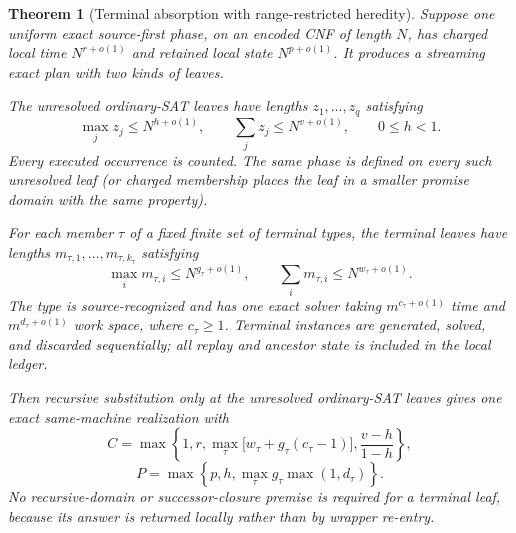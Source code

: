 \documentclass[11pt]{article}
\newtheorem{theorem}{Theorem}
\begin{document}
\begin{theorem}[Terminal absorption with range-restricted heredity]
\label{thm:absorb}
Suppose one uniform exact source-first phase, on an encoded CNF of length
$N$, has charged local time $N^{r+o(1)}$ and retained local state
$N^{p+o(1)}$.  It produces a streaming exact plan with two kinds of leaves.

The unresolved ordinary-SAT leaves have lengths $z_1,\ldots,z_q$ satisfying
\[
  \max_j z_j\le N^{h+o(1)},\qquad
  \sum_j z_j\le N^{v+o(1)},\qquad 0\le h<1.              \tag{1}
\]
Every executed occurrence is counted.  The same phase is defined on every
such unresolved leaf (or charged membership places the leaf in a smaller
promise domain with the same property).

For each member $\tau$ of a fixed finite set of terminal types, the terminal
leaves have lengths $m_{\tau,1},\ldots,m_{\tau,k_\tau}$ satisfying
\[
 \max_i m_{\tau,i}\le N^{g_\tau+o(1)},\qquad
 \sum_i m_{\tau,i}\le N^{w_\tau+o(1)}.                 \tag{2}
\]
The type is source-recognized and has one exact solver taking
$m^{c_\tau+o(1)}$ time and $m^{d_\tau+o(1)}$ work space, where
$c_\tau\ge1$.  Terminal instances are generated, solved, and discarded
sequentially; all replay and ancestor state is included in the local ledger.

Then recursive substitution only at the unresolved ordinary-SAT leaves gives
one exact same-machine realization with
\[
 \boxed{C=\max\!\left\{1,r,
      \max_\tau\bigl[w_\tau+g_\tau(c_\tau-1)\bigr],
      \frac{v-h}{1-h}\right\}},                         \tag{3}
\]
\[
 \boxed{P=\max\!\left\{p,h,
      \max_\tau g_\tau\max(1,d_\tau)\right\}}.        \tag{4}
\]
No recursive-domain or successor-closure premise is required for a terminal
leaf, because its answer is returned locally rather than by wrapper re-entry.
\end{theorem}
\end{document}
